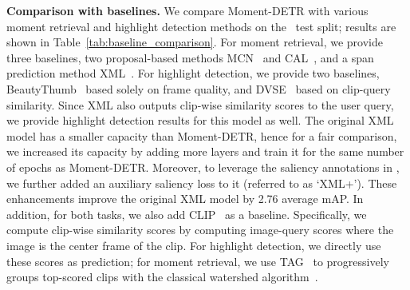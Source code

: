 \textbf{Comparison with baselines.}
We compare Moment-DETR with various moment retrieval and highlight detection methods on the \DatasetName~test split; results are shown in Table~\ref{tab:baseline_comparison}.
For moment retrieval, we provide three baselines, two proposal-based methods MCN~\cite{anne2017localizing} and CAL~\cite{escorcia2019temporal}, and a span prediction method XML~\cite{lei2020tvr}.
For highlight detection, we provide two baselines, BeautyThumb~\cite{song2016click} based solely on frame quality, and DVSE~\cite{liu2015multi} based on clip-query similarity.
Since XML also outputs clip-wise similarity scores to the user query, we provide highlight detection results for this model as well.
The original XML model has a smaller capacity than Moment-DETR, hence for a fair comparison, we increased its capacity by adding more layers and train it for the same number of epochs as Moment-DETR. Moreover, to leverage the saliency annotations in \DatasetName, we further added an auxiliary saliency loss to it (referred to as `XML+'). 
These enhancements improve the original XML model by 2.76 average mAP.
In addition, for both tasks, we also add CLIP~\cite{radford2021learning} as a baseline. Specifically, we compute clip-wise similarity scores by computing image-query scores where the image is the center frame of the clip. For highlight detection, we directly use these scores as prediction; for moment retrieval, we use TAG~\cite{zhao2017temporal} to progressively groups top-scored clips with the classical watershed algorithm~\cite{roerdink2000watershed}. 



